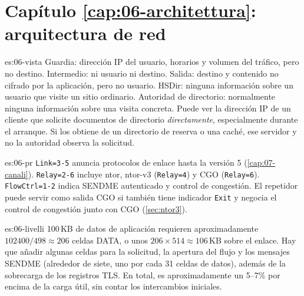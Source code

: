 \section*{Capítulo \ref{cap:06-architettura}: arquitectura de red}

\begin{soluzione}{es:06-vista}
Guardia: dirección IP del usuario, horarios y volumen del tráfico, pero no destino. Intermedio: ni usuario ni destino. Salida: destino y contenido no cifrado por la aplicación, pero no usuario. HSDir: ninguna información sobre un usuario que visite un sitio ordinario. Autoridad de directorio: normalmente ninguna información sobre una visita concreta. Puede ver la dirección IP de un cliente que solicite documentos de directorio \emph{directamente}, especialmente durante el arranque. Si los obtiene de un directorio de reserva o una caché, ese servidor y no la autoridad observa la solicitud.
\end{soluzione}

\begin{soluzione}{es:06-pr}
\texttt{Link=3-5} anuncia protocolos de enlace hasta la versión 5 (\cref{cap:07-canali}). \texttt{Relay=2-6} incluye ntor, ntor-v3 (\texttt{Relay=4}) y CGO (\texttt{Relay=6}). \texttt{FlowCtrl=1-2} indica SENDME autenticado y control de congestión. El repetidor puede servir como salida CGO si también tiene indicador \texttt{Exit} y negocia el control de congestión junto con CGO (\cref{sec:ntor3}).
\end{soluzione}

\begin{soluzione}{es:06-livelli}
100\,KB de datos de aplicación requieren aproximadamente $102400/498 \approx 206$ celdas DATA, o unos $206\times514\approx106$\,KB sobre el enlace. Hay que añadir algunas celdas para la solicitud, la apertura del flujo y los mensajes SENDME (alrededor de siete, uno por cada 31 celdas de datos), además de la sobrecarga de los registros TLS. En total, es aproximadamente un 5--7\% por encima de la carga útil, sin contar los intercambios iniciales.
\end{soluzione}
